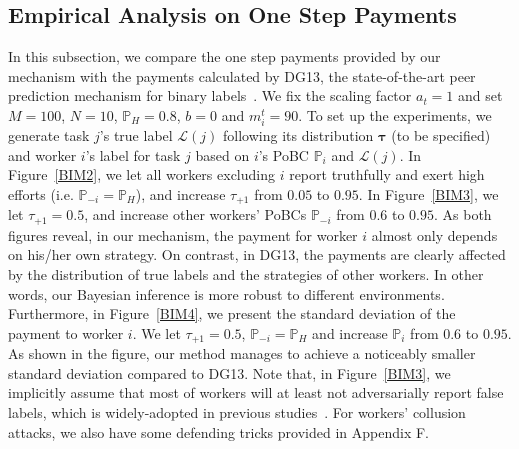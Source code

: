 \documentclass{article}
\newcommand{\com}[1]{\textbf{\color{red}(COMMENT: #1)}} %
\newcommand{\com}[1]{}
\begin{document}
\subsection{Empirical Analysis on One Step Payments}
In this subsection, we compare the one step payments provided by our mechanism with the payments calculated by DG13, the state-of-the-art peer prediction mechanism for binary labels~\cite{dasgupta2013crowdsourced}.
We fix the scaling factor $a_t=1$ and set $M=100$, $N=10$, $\mathbb{P}_H=0.8$, $b=0$ and $m_i^t=90$. 
To set up the experiments, we generate task $j$'s true label $\mathcal{L}(j)$ following its distribution $\bm{\tau}$ (to be specified) and worker $i$'s label for task $j$ based on $i$'s PoBC $\mathbb{P}_i$ and $\mathcal{L}(j)$.
In Figure~\ref{BIM2}, we let all workers excluding $i$ report truthfully and exert high efforts (i.e. $\mathbb{P}_{-i} = \mathbb{P}_H$), 
and increase $\tau_{+1}$ from $0.05$ to $0.95$.
In Figure~\ref{BIM3}, we let $\tau_{+1}=0.5$, and increase other workers' PoBCs $\mathbb{P}_{-i}$ from $0.6$ to $0.95$.
As both figures reveal, in our mechanism, the payment for worker $i$ almost only depends on his/her own strategy. On contrast, in DG13, the payments are clearly affected by the distribution of true labels and the strategies of other workers.
In other words, our Bayesian inference is more robust to different environments.
Furthermore, in Figure~\ref{BIM4}, we present the standard deviation of the payment to worker $i$.
We let $\tau_{+1}=0.5$, $\mathbb{P}_{-i}=\mathbb{P}_H$ and increase $\mathbb{P}_i$ from $0.6$ to $0.95$.
As shown in the figure, our method manages to achieve a noticeably smaller standard deviation compared to DG13.
Note that, in Figure~\ref{BIM3}, we implicitly assume that most of workers will at least not adversarially report false labels, which is widely-adopted in previous studies~\cite{liu2012variational}.
For workers' collusion attacks, we also have some defending tricks provided in Appendix F.
\end{document}
